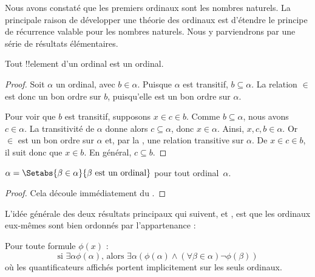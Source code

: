 \documentclass[../../../include/open-logic-section]{subfiles}
\begin{document}

Nous avons constaté que les premiers ordinaux sont les nombres
naturels. La principale raison de développer une théorie des ordinaux
est d'étendre le principe de récurrence valable pour les nombres
naturels. Nous y parviendrons par une série de résultats élémentaires.

\begin{lem}
Tout !!{element} d'un ordinal est un ordinal.
\end{lem}

\begin{proof}
Soit $\alpha$ un ordinal, avec $b \in \alpha$. Puisque $\alpha$
est transitif, $b \subseteq \alpha$. La relation $\in$ est donc un
bon ordre sur $b$, puisqu'elle est un bon ordre sur $\alpha$.

Pour voir que $b$ est transitif, supposons $x \in c \in b$. Comme
$b \subseteq \alpha$, nous avons $c \in \alpha$. La transitivité de
$\alpha$ donne alors $c \subseteq \alpha$, donc $x \in \alpha$.
Ainsi, $x, c, b \in \alpha$. Or $\in$ est un bon ordre sur $\alpha$
et, par la , une relation
transitive sur $\alpha$. De $x \in c \in b$, il suit donc que
$x \in b$. En général, $c \subseteq b$.
\end{proof}

\begin{cor}
$\alpha = \Setabs{\beta \in \alpha}{\beta \text{ est un ordinal}}$
pour tout ordinal~$\alpha$.
\end{cor}

\begin{proof}
Cela découle immédiatement du .
\end{proof}

L'idée générale des deux résultats principaux qui suivent,
 et , est que les
ordinaux eux-mêmes sont bien ordonnés par l'appartenance :

\begin{thm}
Pour toute formule $\phi(x)$ :
\[
	\text{si }\exists \alpha \phi(\alpha)\text{, alors }\exists \alpha(\phi(\alpha)
	\land  (\forall \beta \in \alpha) \lnot \phi(\beta))
\]
où les quantificateurs affichés portent implicitement sur les seuls
ordinaux.
\end{thm}
\end{document}
